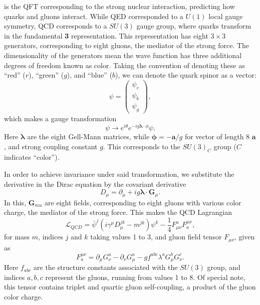         is the \gls{QFT} corresponding to the strong nuclear interaction, predicting how quarks and gluons interact. While \gls{QED} corresponded to a $U(1)$ local gauge symmetry, \gls{QCD} corresponds to a $SU(3)$ gauge group, where quarks transform in the fundamental {\bf 3} representation. This representation has eight $3 \times 3$ generators, corresponding to eight gluons, the mediator of the strong force. The dimensionality of the generators mean the wave function has three additional degrees of freedom known as color. Taking the convention of denoting these as ``red'' ($r$), ``green'' ($g$), and ``blue'' ($b$), we can denote the quark spinor as a vector:
        \begin{equation}
            \psi =\begin{pmatrix} \psi_{r} \\ \psi_{b} \\ \psi_{g}\end{pmatrix},
        \end{equation}
        which makes a gauge transformation
        \begin{equation}
        \psi \rightarrow e^{i\theta}e^{-ig {\boldsymbol \lambda\cdot \phi}}\psi.
        \end{equation}
        Here $\boldsymbol \lambda$ are the eight Gell-Mann matrices, while ${\boldsymbol \phi} = -{\boldsymbol a}/g$ for vector of length 8 $\boldsymbol a$, and strong coupling constant $g$. This corresponds to the $SU(3)_C$ group ($C$ indicates ``color'').

        In order to achieve invariance under said transformation, we substitute the derivative in the Dirac equation by the covariant derivative 
        \begin{equation}
            D_{\mu} = \partial_{\mu} + ig {\boldsymbol \lambda\cdot {\boldsymbol G_{\mu}}}.
        \end{equation}
        In this, ${\boldsymbol G_{mu}}$ are eight fields, corresponding to eight gluons with various color charge, the mediator of the strong force. This makes the \gls{QCD} Lagrangian
        \begin{equation}
            \mathcal{L}_{QCD} = \bar{\psi}^j (i \gamma^{\mu} D_{\mu}^{jk} - m^{jk})\psi^{k} - \frac{1}{4} F_{\mu \nu}^{a} F^{\mu \nu}_{a},
        \end{equation}
        for mass $m$, indices $j$ and $k$ taking values 1 to 3, and gluon field tensor $F_{\mu \nu}$, given as
        \begin{equation}
            F^{\mu \nu}_{a} = \partial_{\mu} G_{\nu}^a - \partial_{\nu}G_{\mu}^a - g f^{abc} \lambda^a G_{\mu}^b G_{\nu}^c.
        \end{equation}
        Here $f_{abc}$ are the structure constants associated with the $SU(3)$ group, and indices $a,b,c$ represent the gluons, running from values 1 to 8. Of special note, this tensor contains triplet and quartic gluon self-coupling, a product of the gluon color charge.


